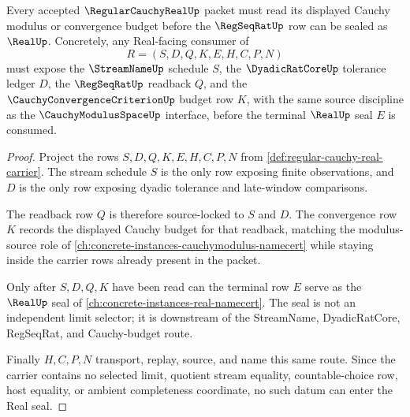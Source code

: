 \begin{theorem}
\label{thm:regular-cauchy-real-cauchy-modulus-source-lock}
Every accepted $\RegularCauchyRealUp$ packet must read its displayed Cauchy modulus or convergence budget before the $\RegSeqRatUp$ row can be sealed as $\RealUp$. Concretely, any Real-facing consumer of
$$
R=(S,D,Q,K,E,H,C,P,N)
$$
must expose the $\StreamNameUp$ schedule $S$, the $\DyadicRatCoreUp$ tolerance ledger $D$, the $\RegSeqRatUp$ readback $Q$, and the $\CauchyConvergenceCriterionUp$ budget row $K$, with the same source discipline as the $\CauchyModulusSpaceUp$ interface, before the terminal $\RealUp$ seal $E$ is consumed.
\end{theorem}
\begin{proof}
Project the rows $S,D,Q,K,E,H,C,P,N$ from \autoref{def:regular-cauchy-real-carrier}. The stream schedule $S$ is the only row exposing finite observations, and $D$ is the only row exposing dyadic tolerance and late-window comparisons.

The readback row $Q$ is therefore source-locked to $S$ and $D$. The convergence row $K$ records the displayed Cauchy budget for that readback, matching the modulus-source role of \autoref{ch:concrete-instances-cauchymodulus-namecert} while staying inside the carrier rows already present in the packet.

Only after $S,D,Q,K$ have been read can the terminal row $E$ serve as the $\RealUp$ seal of \autoref{ch:concrete-instances-real-namecert}. The seal is not an independent limit selector; it is downstream of the StreamName, DyadicRatCore, RegSeqRat, and Cauchy-budget route.

Finally $H,C,P,N$ transport, replay, source, and name this same route. Since the carrier contains no selected limit, quotient stream equality, countable-choice row, host equality, or ambient completeness coordinate, no such datum can enter the Real seal.
\end{proof}

